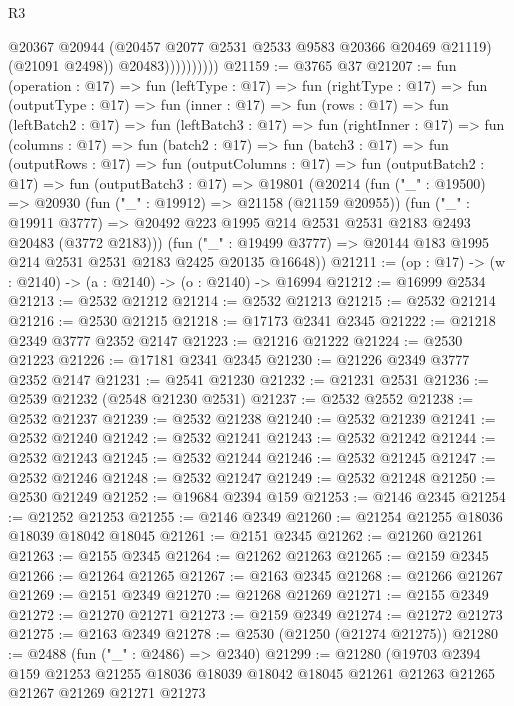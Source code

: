 \begin{lexlean}{R3}
\begin{coremodule}
                          @20367
                          @20944
                          (@20457 @2077 @2531 @2533 @9583 @20366 @20469 @21119)
                          (@21091 @2498))
                        @20483))))))))))
@21159 := @3765 @37
@21207 := fun (operation : @17) =>
  fun (leftType : @17) =>
  fun (rightType : @17) =>
  fun (outputType : @17) =>
  fun (inner : @17) =>
  fun (rows : @17) =>
  fun (leftBatch2 : @17) =>
  fun (leftBatch3 : @17) =>
  fun (rightInner : @17) =>
  fun (columns : @17) =>
  fun (batch2 : @17) =>
  fun (batch3 : @17) =>
  fun (outputRows : @17) =>
  fun (outputColumns : @17) =>
  fun (outputBatch2 : @17) =>
  fun (outputBatch3 : @17) =>
  @19801
    (@20214
      (fun ("_" : @19500) =>
      @20930
        (fun ("_" : @19912) => @21158 (@21159 @20955))
        (fun ("_" : @19911 @3777) =>
        @20492 @223 @1995 @214 @2531 @2531 @2183 @2493 @20483 (@3772 @2183)))
      (fun ("_" : @19499 @3777) => @20144 @183 @1995 @214 @2531 @2531 @2183 @2425 @20135 @16648))
@21211 := (op : @17) -> (w : @2140) -> (a : @2140) -> (o : @2140) -> @16994
@21212 := @16999 @2534
@21213 := @2532 @21212
@21214 := @2532 @21213
@21215 := @2532 @21214
@21216 := @2530 @21215
@21218 := @17173 @2341 @2345
@21222 := @21218 @2349 @3777 @2352 @2147
@21223 := @21216 @21222
@21224 := @2530 @21223
@21226 := @17181 @2341 @2345
@21230 := @21226 @2349 @3777 @2352 @2147
@21231 := @2541 @21230
@21232 := @21231 @2531
@21236 := @2539 @21232 (@2548 @21230 @2531)
@21237 := @2532 @2552
@21238 := @2532 @21237
@21239 := @2532 @21238
@21240 := @2532 @21239
@21241 := @2532 @21240
@21242 := @2532 @21241
@21243 := @2532 @21242
@21244 := @2532 @21243
@21245 := @2532 @21244
@21246 := @2532 @21245
@21247 := @2532 @21246
@21248 := @2532 @21247
@21249 := @2532 @21248
@21250 := @2530 @21249
@21252 := @19684 @2394 @159
@21253 := @2146 @2345
@21254 := @21252 @21253
@21255 := @2146 @2349
@21260 := @21254 @21255 @18036 @18039 @18042 @18045
@21261 := @2151 @2345
@21262 := @21260 @21261
@21263 := @2155 @2345
@21264 := @21262 @21263
@21265 := @2159 @2345
@21266 := @21264 @21265
@21267 := @2163 @2345
@21268 := @21266 @21267
@21269 := @2151 @2349
@21270 := @21268 @21269
@21271 := @2155 @2349
@21272 := @21270 @21271
@21273 := @2159 @2349
@21274 := @21272 @21273
@21275 := @2163 @2349
@21278 := @2530 (@21250 (@21274 @21275))
@21280 := @2488 (fun ("_" : @2486) => @2340)
@21299 := @21280
    (@19703
      @2394
      @159
      @21253
      @21255
      @18036
      @18039
      @18042
      @18045
      @21261
      @21263
      @21265
      @21267
      @21269
      @21271
      @21273

\end{coremodule}
\end{lexlean}
